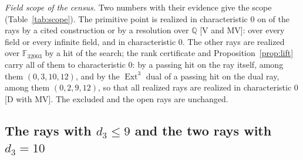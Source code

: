 \documentclass[11pt]{article}
\theoremstyle{definition}
\theoremstyle{remark}
\newcommand{\Q}{\mathbb{Q}}
\newcommand{\F}{\mathbb{F}}
\newcommand{\Ext}{\operatorname{Ext}}
\begin{document}
\begin{table}[htbp]
\centering\footnotesize

\caption{The two hits whose Macaulay2 recheck over $\Q$ ended without a result: the rank test gives equal ranks over $\Q$ and $\F_{32003}$ in every degree, and Singular over $\Q$ gives the primitive point on each ray, with the length equal to the sum of the Hilbert function of the rank test and the time of the resolution in seconds.}
\label{tab:lift}
\end{table}

\emph{Field scope of the census.} Two numbers with their evidence give the scope (Table~\ref{tab:scope}). The primitive point is realized in characteristic $0$ on \nrealizedZero{} of the \nrealized{} rays by a cited construction or by a resolution over $\Q$ [V and MV]: \nrealizedEvery{} over every field or every infinite field, and \nrealizedZeroOnly{} in characteristic $0$. The other \nrealizedPrimeOnly{} rays are realized over $\F_{32003}$ by a hit of the search; the rank certificate and Proposition~\ref{prop:lift} carry all of them to characteristic $0$: \nfourDirect{} by a passing hit on the ray itself, among them $(0,3,10,12)$, and \nfourDual{} by the $\Ext^3$ dual of a passing hit on the dual ray, among them $(0,2,9,12)$, so that all \nrealized{} realized rays are realized in characteristic $0$ [D with MV]. The \nexcluded{} excluded and the \nopen{} open rays are unchanged.

\begin{table}[htbp]
\centering\footnotesize

\caption{Field scope of the \nrealized{} rays with $d_3\le12$ whose primitive point is realized over $S$, with the evidence for each group and its mark: the rays realized over every field or infinite field and in characteristic $0$ by a cited construction or a resolution over $\Q$ do not use the lift proposition, and the rays realized over $\F_{32003}$ only use it together with the rank certificate.}
\label{tab:scope}
\end{table}

\subsection{The rays with \texorpdfstring{$d_3\le9$}{d3<=9} and the two rays with \texorpdfstring{$d_3=10$}{d3=10}}
\end{document}
